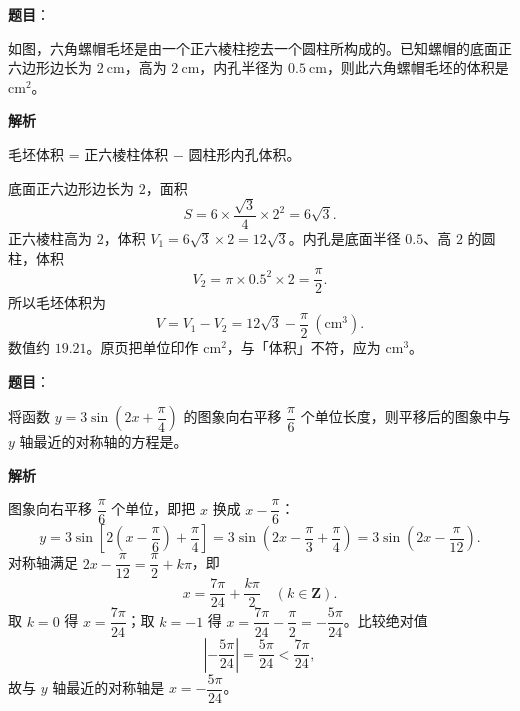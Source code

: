 \begin{answer}

\textbf{题目}：

如图，六角螺帽毛坯是由一个正六棱柱挖去一个圆柱所构成的。已知螺帽的底面正六边形边长为 $2\ \mathrm{cm}$，高为 $2\ \mathrm{cm}$，内孔半径为 $0.5\ \mathrm{cm}$，则此六角螺帽毛坯的体积是\gkblank{}$\mathrm{cm}^2$。
\nopagebreak[4]
\begin{center}\end{center}
\nopagebreak[4]
\textbf{解析}

毛坯体积 = 正六棱柱体积 $-$ 圆柱形内孔体积。

底面正六边形边长为 $2$，面积
\nopagebreak[4]
\[S=6\times\frac{\sqrt3}{4}\times2^2=6\sqrt3 .\]
正六棱柱高为 $2$，体积 $V_1=6\sqrt3\times2=12\sqrt3$。内孔是底面半径 $0.5$、高 $2$ 的圆柱，体积
\nopagebreak[4]
\[V_2=\pi\times0.5^2\times2=\frac\pi2 .\]
所以毛坯体积为
\nopagebreak[4]
\[V=V_1-V_2=12\sqrt3-\frac\pi2\ \left(\mathrm{cm}^3\right).\]
数值约 $19.21$。原页把单位印作 $\mathrm{cm}^2$，与「体积」不符，应为 $\mathrm{cm}^3$。


\end{answer}
\begin{answer}

\textbf{题目}：

将函数 $y=3\sin\left(2x+\dfrac\pi4\right)$ 的图象向右平移 $\dfrac\pi6$ 个单位长度，则平移后的图象中与 $y$ 轴最近的对称轴的方程是\gkblank{}。

\textbf{解析}

图象向右平移 $\dfrac\pi6$ 个单位，即把 $x$ 换成 $x-\dfrac\pi6$：
\nopagebreak[4]
\[y=3\sin\left[2\left(x-\frac\pi6\right)+\frac\pi4\right]=3\sin\left(2x-\frac\pi3+\frac\pi4\right)=3\sin\left(2x-\frac{\pi}{12}\right).\]
对称轴满足 $2x-\dfrac\pi{12}=\dfrac\pi2+k\pi$，即
\nopagebreak[4]
\[x=\frac{7\pi}{24}+\frac{k\pi}{2}\quad(k\in\mathbf Z).\]
取 $k=0$ 得 $x=\dfrac{7\pi}{24}$；取 $k=-1$ 得 $x=\dfrac{7\pi}{24}-\dfrac\pi2=-\dfrac{5\pi}{24}$。比较绝对值
\nopagebreak[4]
\[\left|-\frac{5\pi}{24}\right|=\frac{5\pi}{24}<\frac{7\pi}{24},\]
故与 $y$ 轴最近的对称轴是 $x=-\dfrac{5\pi}{24}$。


\end{answer}
